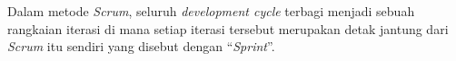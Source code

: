 \par Dalam metode \textit{Scrum}, seluruh \textit{development cycle} terbagi menjadi sebuah rangkaian iterasi di mana setiap iterasi tersebut merupakan detak jantung dari \textit{Scrum} itu sendiri yang disebut dengan “\textit{Sprint}”.
